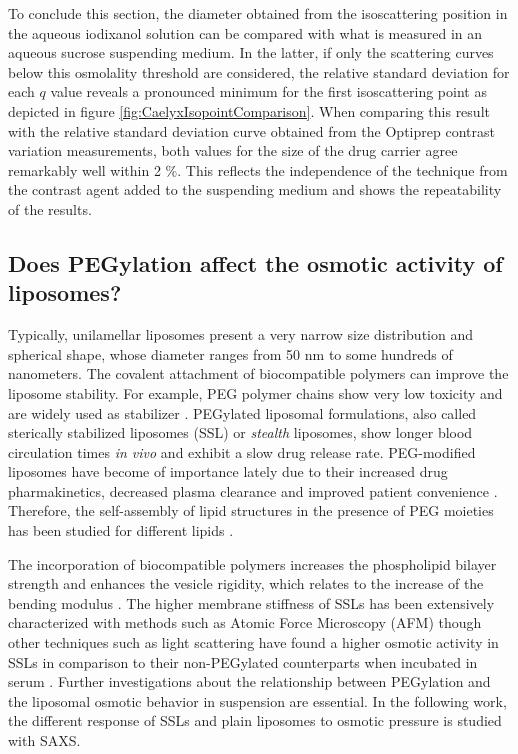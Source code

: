 To conclude this section, the diameter obtained from the isoscattering position in the aqueous iodixanol solution can be compared with what is measured in an aqueous sucrose suspending medium. In the latter, if only the scattering curves below this osmolality threshold are considered, the relative standard deviation for each $q$ value reveals a pronounced minimum for the first isoscattering point as depicted in figure \ref{fig:CaelyxIsopointComparison}. When comparing this result with the relative standard deviation curve obtained from the Optiprep contrast variation measurements, both values for the size of the drug carrier agree remarkably well within 2 $\%$. This reflects the independence of the technique from the contrast agent added to the suspending medium and shows the repeatability of the results.


\subsection{Does PEGylation affect the osmotic activity of liposomes?}
\label{sec:liposome_osmotic}

Typically, unilamellar liposomes present a very narrow size distribution and spherical shape, whose diameter ranges from 50 nm to some hundreds of nanometers. The covalent attachment of biocompatible polymers can improve the liposome stability. For example, PEG polymer chains show very low toxicity \citep{yamaoka_distribution_1994} and are widely used as stabilizer \citep{sou_polyethylene_2000}. PEGylated liposomal formulations, also called sterically stabilized liposomes (SSL) or \emph{stealth} liposomes, show longer blood circulation times \emph{in vivo} \citep{barenholz_liposome_2001} and exhibit a slow drug release rate. PEG-modified liposomes have become of importance lately due to their increased drug pharmakinetics, decreased plasma clearance and improved patient convenience \citep{gabizon_polyethylene_1997,harris_effect_2003}. Therefore, the self-assembly of lipid structures in the presence of PEG moieties has been studied for different lipids \citep{lee_coarse-grained_2011}.

The incorporation of biocompatible polymers increases the phospholipid bilayer strength and enhances the vesicle rigidity, which relates to the increase of the bending modulus \citep{liang_effect_2005, sou_polyethylene_2000}. The higher membrane stiffness of SSLs has been extensively characterized with methods such as Atomic Force Microscopy (AFM) \citep{spyratou_atomic_2009} though other techniques such as light scattering have found a higher osmotic activity in SSLs in comparison to their non-PEGylated counterparts when incubated in serum \citep{wolfram_shrinkage_2014}. Further investigations about the relationship between PEGylation and the liposomal osmotic behavior in suspension are essential. In the following work, the different response of SSLs and plain liposomes to osmotic pressure is studied with SAXS. 

